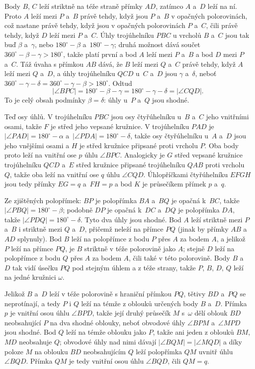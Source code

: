 {    Body $B$, $C$ leží striktně na téže straně přímky $AD$, zatímco $A$ a~$D$ leží na ní. Proto $A$ leží mezi $P$ a~$B$ právě tehdy, když jsou $P$ a~$B$ v opačných polorovinách, což nastane právě tehdy, když jsou v opačných polorovinách $P$ a~$C$, čili právě tehdy, když $D$ leží mezi $P$ a~$C$. Úhly trojúhelníku $PBC$ u vrcholů $B$ a~$C$ jsou tak buď $\beta$ a~$\gamma$, nebo $180^\circ - \beta$ a~$180^\circ - \gamma$; druhá možnost dává součet $360^\circ - \beta - \gamma > 180^\circ$, takže platí první a bod $A$ leží mezi $P$ a~$B$ a bod $D$ mezi $P$ a~$C$. Táž úvaha s přímkou $AB$ dává, že $B$ leží mezi $Q$ a~$C$ právě tehdy, když $A$ leží mezi $Q$ a~$D$, a úhly trojúhelníku $QCD$ u~$C$ a~$D$ jsou $\gamma$ a~$\delta$, neboť $360^\circ - \gamma - \delta = 360^\circ - \gamma - \beta > 180^\circ$. Odtud
    $$
    |\angle BPC| = 180^\circ - \beta - \gamma = 180^\circ - \gamma - \delta = |\angle CQD|.
    $$
    To je celý obsah podmínky $\beta = \delta$: úhly u~$P$ a~$Q$ jsou shodné.

    Teď osy úhlů. V trojúhelníku $PBC$ jsou osy čtyřúhelníku u~$B$ a~$C$ jeho vnitřními osami, takže $F$ je střed jeho vepsané kružnice. V trojúhelníku $PAD$ je $|\angle PAD| = 180^\circ - \alpha$ a~$|\angle PDA| = 180^\circ - \delta$, takže osy čtyřúhelníku u~$A$ a~$D$ jsou jeho vnějšími osami a $H$ je střed kružnice připsané proti vrcholu $P$. Oba body proto leží na vnitřní ose $p$ úhlu $\angle BPC$. Analogicky je $G$ střed vepsané kružnice trojúhelníku $QCD$ a~$E$ střed kružnice připsané trojúhelníku $QAB$ proti vrcholu $Q$, takže oba leží na vnitřní ose $q$ úhlu $\angle CQD$. Úhlopříčkami čtyřúhelníku $EFGH$ jsou tedy přímky $EG = q$ a~$FH = p$ a bod $K$ je průsečíkem přímek $p$ a~$q$.

    Ze zjištěných polopřímek: $BP$ je polopřímka $BA$ a~$BQ$ je opačná k~$BC$, takže $|\angle PBQ| = 180^\circ - \beta$; podobně $DP$ je opačná k~$DC$ a~$DQ$ je polopřímka $DA$, takže $|\angle PDQ| = 180^\circ - \delta$. Tyto dva úhly jsou shodné. Bod $A$ leží striktně mezi $P$ a~$B$ i striktně mezi $Q$ a~$D$, přičemž neleží na přímce $PQ$ (jinak by přímky $AB$ a~$AD$ splynuly). Bod $B$ leží na polopřímce z bodu $P$ přes $A$ za bodem $A$, a jelikož $P$ leží na přímce $PQ$, je $B$ striktně v téže polorovině jako $A$; stejně $D$ leží na polopřímce z bodu $Q$ přes $A$ za bodem $A$, čili také v této polorovině. Body $B$ a~$D$ tak vidí úsečku $PQ$ pod stejným úhlem a z téže strany, takže $P$, $B$, $D$, $Q$ leží na jedné kružnici $\omega$.

    Jelikož $B$ a~$D$ leží v téže polorovině s hraniční přímkou $PQ$, tětivy $BD$ a~$PQ$ se neprotínají, a tedy $P$ i $Q$ leží na témže z oblouků určených body $B$ a~$D$. Přímka $p$ je vnitřní osou úhlu $\angle BPD$, takže její druhý průsečík $M$ s~$\omega$ dělí oblouk $BD$ neobsahující $P$ na dva shodné oblouky, neboť obvodové úhly $\angle BPM$ a~$\angle MPD$ jsou shodné. Bod $Q$ leží na témže oblouku jako $P$, takže ani jeden z oblouků $BM$, $MD$ neobsahuje $Q$; obvodové úhly nad nimi dávají $|\angle BQM| = |\angle MQD|$ a díky poloze $M$ na oblouku $BD$ neobsahujícím $Q$ leží polopřímka $QM$ uvnitř úhlu $\angle BQD$. Přímka $QM$ je tedy vnitřní osou úhlu $\angle BQD$, čili $QM = q$.

}
